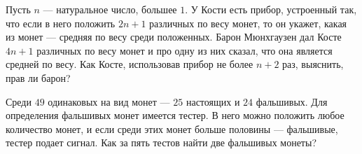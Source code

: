 \documentclass{article}
\begin{document}
\begin{enumerate_boxed}
        \item Пусть $n$ — натуральное число, большее $1$.
        У Кости есть прибор, устроенный так, что если в него положить $2n+1$ различных по весу монет, то он укажет, какая из монет — средняя по весу среди положенных.
        Барон Мюнхгаузен дал Косте $4n+1$ различных по весу монет и про одну из них сказал, что она является средней по весу.
        Как Косте, использовав прибор не более $n+2$ раз, выяснить, прав ли барон?

        \item Среди $49$ одинаковых на вид монет — $25$ настоящих и $24$ фальшивых.
        Для определения фальшивых монет имеется тестер.
        В него можно положить любое количество монет, и если среди этих монет больше половины — фальшивые, тестер подает сигнал.
        Как за пять тестов найти две фальшивых монеты?


    \end{enumerate_boxed}
\end{document}
